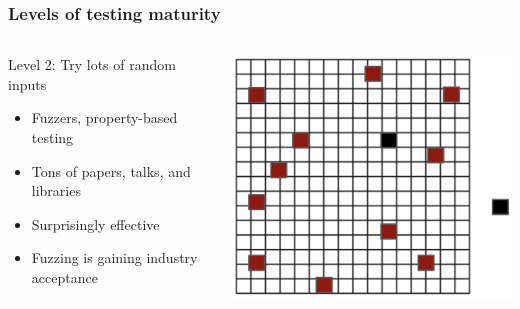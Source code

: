 \documentclass{beamer}
\begin{document}
\begin{frame}
	\frametitle{Levels of testing maturity}

	\begin{columns}[onlytextwidth]
		\begin{column}{.5\textwidth}
Level 2: Try lots of random inputs
	\begin{itemize}
		\item{Fuzzers, property-based testing}
		\item{Tons of papers, talks, and libraries}
		\item{Surprisingly effective \cite{Dinaburg_2018}}
		\item{Fuzzing is gaining industry acceptance}
	\end{itemize}
		\end{column}
		\begin{column}{.5\textwidth}
			\centering \includegraphics[scale=.75]{phase2}
		\end{column}
	\end{columns}

\end{frame}
\end{document}
